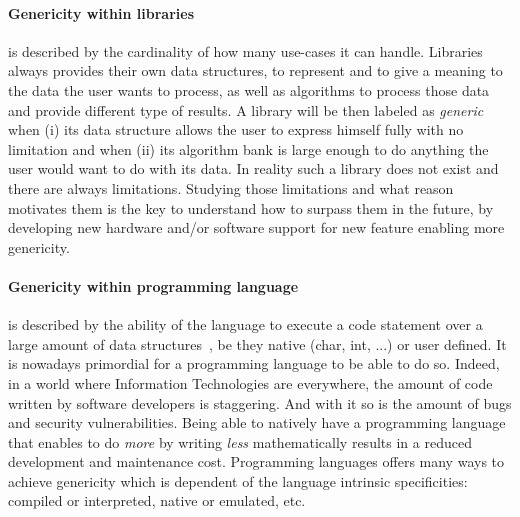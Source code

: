 \paragraph{Genericity within libraries} is described by the cardinality of how many use-cases it can handle. Libraries
always provides their own data structures, to represent and to give a meaning to the data the user wants to process, as
well as algorithms to process those data and provide different type of results. A library will be then labeled as
\emph{generic}~\parencite{musser.1994.algorithm} when (i) its data structure allows the user
to express himself fully with no limitation and when (ii) its algorithm bank is large enough to do anything the user
would want to do with its data. In reality such a library does not exist and there are always limitations. Studying
those limitations and what reason motivates them is the key to understand how to surpass them in the future, by
developing new hardware and/or software support for new feature enabling more genericity.

\paragraph{Genericity within programming language} is described by the ability of the language to execute a code
statement over a large amount of data structures~\parencite{dehnert.1998.fundamentals}, be they native (char, int, ...)
or user defined. It is nowadays primordial for a programming language to be able to do so. Indeed, in a world where
Information Technologies are everywhere, the amount of code written by software developers is staggering. And with it so
is the amount of bugs and security vulnerabilities. Being able to natively have a programming language that enables to
do \emph{more} by writing \emph{less} mathematically results in a reduced development and maintenance cost. Programming
languages offers many ways to achieve genericity which is dependent of the language intrinsic specificities: compiled or
interpreted, native or emulated, etc.

